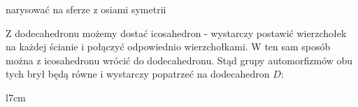 {\large\color{red}narysować na sferze z osiami symetrii}

Z dodecahedronu możemy dostać icosahedron - wystarczy postawić wierzchołek na każdej ścianie i połączyć odpowiednio wierzchołkami. W ten sam sposób można z icosahedronu wrócić do dodecahedronu. Stąd grupy automorfizmów obu tych brył będą równe i wystarczy popatrzeć na dodecahedron $D$:

\begin{wrapfigure}{l}{7cm}
\end{wrapfigure}
